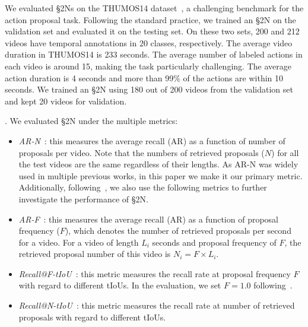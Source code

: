 \documentclass[10pt,journal,compsoc]{IEEEtran}
\begin{document}


 We evaluated \S2Ns on the THUMOS14 dataset~\cite{THUMOS14}, a challenging benchmark for the action proposal task. Following the standard practice, we trained an \S2N on the validation set and evaluated it on the testing set. On these two sets, 200 and 212 videos have temporal annotations in 20 classes, respectively. The average video duration in THUMOS14 is 233 seconds. The average number of labeled actions  in each video is around 15, making the task particularly challenging. The average action duration is 4 seconds and more than 99\% of the actions are within 10 seconds. We trained an \S2N using 180 out of 200 videos from the validation set and kept 20 videos for validation.

. We evaluated \S2N under the multiple metrics:

\begin{itemize}
	\item \textit{AR-N}~\cite{yu2015fast, lin2018BSN}: this measures the average recall (AR) as a function of number of proposals per video. Note that the numbers of retrieved proposals ($N$) for all the test videos are the same regardless of their lengths. As AR-N was widely used in multiple previous works, in this paper we make it our primary metric. Additionally, following~\cite{Gao_2017_ICCV}, we also use the following metrics to further investigate the performance of \S2N.
	\item \textit{AR-F}~\cite{Gao_2017_ICCV}: this measures the average recall (AR) as a function of proposal frequency ($F$), which denotes the number of retrieved proposals per second for a video. For a video of length $L_i$ seconds and proposal frequency of $F$, the retrieved proposal number of this video is $N_i = F\times L_i$. 
	\item \textit{Recall@F-tIoU}~\cite{Gao_2017_ICCV}: this metric measures the recall rate at proposal frequency $F$ with regard to different tIoUs. In the evaluation, we set $F=1.0$ following~\cite{Gao_2017_ICCV}.
	\item \textit{Recall@N-tIoU}~\cite{Gao_2017_ICCV}: this metric measures the recall rate at number of retrieved proposals with regard to different tIoUs. 

\end{itemize}
\end{document}
